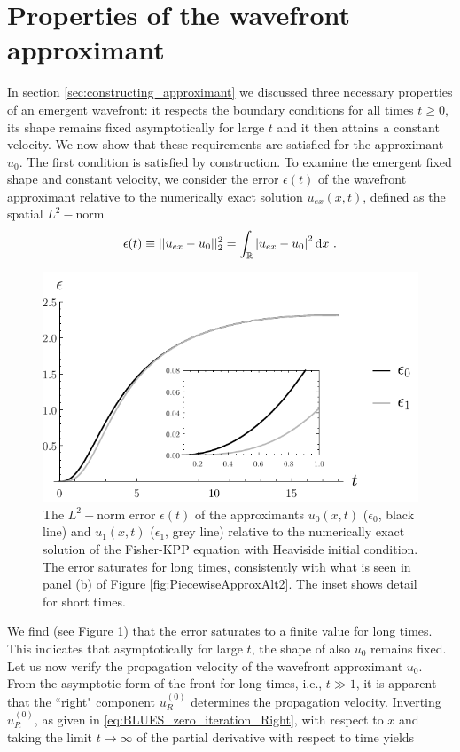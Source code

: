 \documentclass[amsmath,amssymb,amsfonts,aps,pre,preprint,superscriptaddress,showpacs,showkeys,longbibliography,nofootinbib]{revtex4-1}
\begin{document}
\section{Properties of the wavefront approximant} \label{sec:properties}
In section \ref{sec:constructing_approximant} we discussed  three necessary properties of an emergent wavefront: it respects the boundary conditions for all times $t\geq0$, its shape remains fixed asymptotically for large $t$ and it then attains a constant velocity. We now show that these requirements are satisfied for the approximant $u_0$.  The first condition is satisfied by construction. To examine the emergent fixed shape and constant velocity, we consider the error $\epsilon(t)$ of the wavefront approximant relative to the numerically exact solution $u_{ex}(x,t)$, defined as the spatial $L^2-$norm
\begin{align}\label{eq:Error}
    \epsilon(t) \equiv ||u_{ex} - u_0||_2^2 =  \int_{\mathbb{R}} \abs{u_{ex}-u_0}^2\dd{x}\,.
\end{align}
\begin{figure}[t]
    \centering
    \includegraphics[width=0.7\linewidth]{Figures/Error.pdf}
    \caption{ The $L^2-$norm error $\epsilon (t)$ of the approximants $u_0(x,t)$ ($\epsilon_0$, black line) and $u_1(x,t)$ ($\epsilon_1$, grey line) relative to the numerically exact solution of the Fisher-KPP equation with Heaviside initial condition. The error saturates for long times, consistently with what is seen in panel (b) of Figure \ref{fig:PiecewiseApproxAlt2}. The inset shows detail for short times.}
    \label{fig:error}
\end{figure}
We find (see Figure \ref{fig:error}) that the error saturates to a finite value for long times. This indicates that asymptotically for large $t$, the shape of also $u_0$ remains fixed. 
Let us now verify the propagation velocity of the wavefront approximant $u_0$. From the asymptotic form of the front for long times, i.e., $t\gg1$, it is apparent that the ``right" component $u^{(0)}_{R}$ determines the propagation velocity. Inverting $u^{(0)}_{R}$, as given in \eqref{eq:BLUES_zero_iteration_Right}, with respect to $x$ and taking the limit $t\to\infty$ of the partial derivative with respect to time yields
\end{document}
